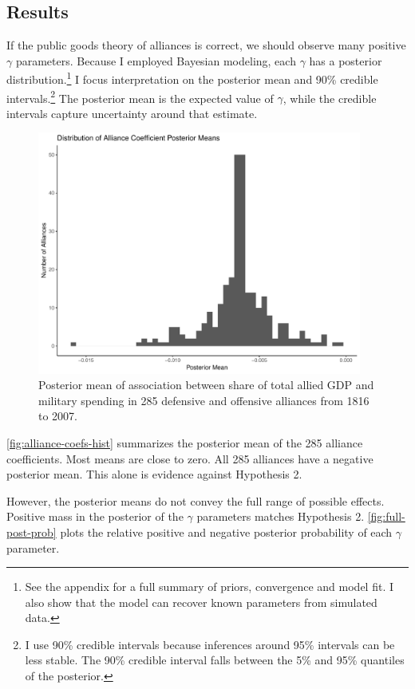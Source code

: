 \documentclass[12pt]{article}
\begin{document}
\subsection{Results} 


If the public goods theory of alliances is correct, we should observe many positive $\gamma$ parameters. 
Because I employed Bayesian modeling, each $\gamma$ has a posterior distribution.\footnote{See the appendix for a full summary of priors, convergence and model fit. I also show that the model can recover known parameters from simulated data.} 
I focus interpretation on the posterior mean and 90\% credible intervals.\footnote{I use 90\% credible intervals because inferences around 95\% intervals can be less stable. The 90\% credible interval falls between the 5\% and 95\% quantiles of the posterior.}
The posterior mean is the expected value of $\gamma$, while the credible intervals capture uncertainty around that estimate.  


\begin{figure}[htbp]
	\centering
		\includegraphics[width=0.95\textwidth]{alliance-coefs-hist.pdf}
	\caption{Posterior mean of association between share of total allied GDP and military spending in 285 defensive and offensive alliances from 1816 to 2007.}
	\label{fig:alliance-coefs-hist}
\end{figure}


\autoref{fig:alliance-coefs-hist} summarizes the posterior mean of the 285 alliance coefficients. 
Most means are close to zero. 
All 285 alliances have a negative posterior mean. 
This alone is evidence against Hypothesis 2. 


However, the posterior means do not convey the full range of possible effects. 
Positive mass in the posterior of the $\gamma$ parameters matches Hypothesis 2. 
\autoref{fig:full-post-prob} plots the relative positive and negative posterior probability of each $\gamma$ parameter. 
\end{document}
